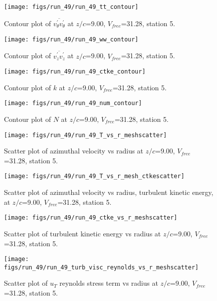 \begin{figure}[H]
\centering
\texttt{[image: figs/run\_49/run\_49\_tt\_contour]}
\caption{Contour plot of $\overline{v_{\theta}^{\prime} v_{\theta}^{\prime}}$ at $z/c$=9.00, $V_{free}$=31.28, station 5.}
\end{figure}


\begin{figure}[H]
\centering
\texttt{[image: figs/run\_49/run\_49\_ww\_contour]}
\caption{Contour plot of $\overline{v_{z}^{\prime} v_{z}^{\prime}}$ at $z/c$=9.00, $V_{free}$=31.28, station 5.}
\end{figure}


\begin{figure}[H]
\centering
\texttt{[image: figs/run\_49/run\_49\_ctke\_contour]}
\caption{Contour plot of $k$ at $z/c$=9.00, $V_{free}$=31.28, station 5.}
\end{figure}


\begin{figure}[H]
\centering
\texttt{[image: figs/run\_49/run\_49\_num\_contour]}
\caption{Contour plot of $N$ at $z/c$=9.00, $V_{free}$=31.28, station 5.}
\end{figure}


\begin{figure}[H]
\centering
\texttt{[image: figs/run\_49/run\_49\_T\_vs\_r\_meshscatter]}
\caption{Scatter plot of azimuthal velocity vs radius at $z/c$=9.00, $V_{free}$=31.28, station 5.}
\end{figure}


\begin{figure}[H]
\centering
\texttt{[image: figs/run\_49/run\_49\_T\_vs\_r\_mesh\_ctkescatter]}
\caption{Scatter plot of azimuthal velocity vs radius, turbulent kinetic energy, at $z/c$=9.00, $V_{free}$=31.28, station 5.}
\end{figure}


\begin{figure}[H]
\centering
\texttt{[image: figs/run\_49/run\_49\_ctke\_vs\_r\_meshscatter]}
\caption{Scatter plot of turbulent kinetic energy vs radius at $z/c$=9.00, $V_{free}$=31.28, station 5.}
\end{figure}


\begin{figure}[H]
\centering
\texttt{[image: figs/run\_49/run\_49\_turb\_visc\_reynolds\_vs\_r\_meshscatter]}
\caption{Scatter plot of $
u_T$ reynolds stress term vs radius at $z/c$=9.00, $V_{free}$=31.28, station 5.}
\end{figure}


